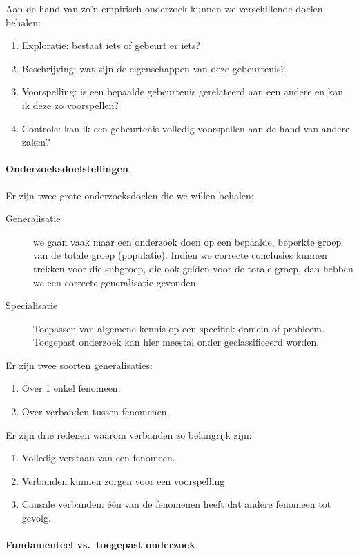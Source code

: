 Aan de hand van zo'n empirisch onderzoek kunnen we verschillende doelen behalen:
\begin{enumerate}
  \item Exploratie: bestaat iets of gebeurt er iets?
  \item Beschrijving: wat zijn de eigenschappen van deze gebeurtenis?
  \item Voorspelling: is een bepaalde gebeurtenis gerelateerd aan een andere en kan ik deze zo voorspellen?
  \item Controle: kan ik een gebeurtenis volledig voorspellen aan de hand van andere zaken?
\end{enumerate}


\paragraph{Onderzoeksdoelstellingen}

Er zijn twee grote onderzoeksdoelen die we willen behalen:

\begin{description}
  \item [Generalisatie] we gaan vaak maar een onderzoek doen op een bepaalde, beperkte groep van de totale groep (populatie). Indien we correcte conclusies kunnen trekken voor die subgroep, die ook gelden voor de totale groep, dan hebben we een correcte generalisatie gevonden.
  \item[Specialisatie] Toepassen van algemene kennis op een specifiek domein of probleem. Toegepast onderzoek kan hier meestal onder geclassificeerd worden.
\end{description}

Er zijn twee soorten generalisaties:
\begin{enumerate}
  \item Over 1 enkel fenomeen.
  \item Over verbanden tussen fenomenen.
\end{enumerate}
Er zijn drie redenen waarom verbanden zo belangrijk zijn:
\begin{enumerate}
  \item Volledig verstaan van een fenomeen. 
  \item Verbanden kunnen zorgen voor een voorspelling
  \item Causale verbanden: één van de fenomenen heeft dat andere fenomeen tot gevolg. 
\end{enumerate}

\paragraph{Fundamenteel vs.~toegepast onderzoek}

